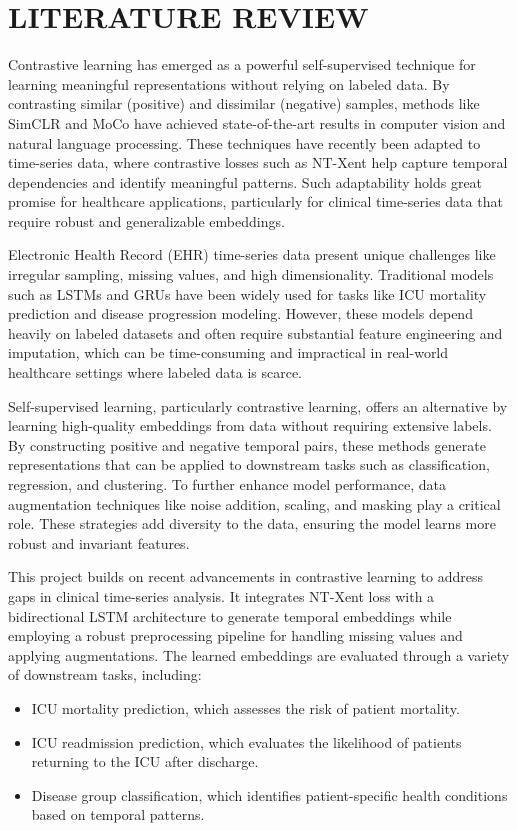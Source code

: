 \documentclass[twocolumn]{article}
\begin{document}
    \section{ \large LITERATURE REVIEW}

    Contrastive learning has emerged as a powerful self-supervised technique for
    learning meaningful representations without relying on labeled data. By contrasting
    similar (positive) and dissimilar (negative) samples, methods like SimCLR
    and MoCo have achieved state-of-the-art results in computer vision and
    natural language processing. These techniques have recently been adapted to time-series
    data, where contrastive losses such as NT-Xent help capture temporal
    dependencies and identify meaningful patterns. Such adaptability holds great
    promise for healthcare applications, particularly for clinical time-series
    data that require robust and generalizable embeddings.

    Electronic Health Record (EHR) time-series data present unique challenges
    like irregular sampling, missing values, and high dimensionality. Traditional
    models such as LSTMs and GRUs have been widely used for tasks like ICU mortality
    prediction and disease progression modeling. However, these models depend heavily
    on labeled datasets and often require substantial feature engineering and imputation,
    which can be time-consuming and impractical in real-world healthcare
    settings where labeled data is scarce.

    Self-supervised learning, particularly contrastive learning, offers an
    alternative by learning high-quality embeddings from data without requiring
    extensive labels. By constructing positive and negative temporal pairs,
    these methods generate representations that can be applied to downstream
    tasks such as classification, regression, and clustering. To further enhance
    model performance, data augmentation techniques like noise addition, scaling,
    and masking play a critical role. These strategies add diversity to the data,
    ensuring the model learns more robust and invariant features.

    This project builds on recent advancements in contrastive learning to
    address gaps in clinical time-series analysis. It integrates NT-Xent loss with
    a bidirectional LSTM architecture to generate temporal embeddings while employing
    a robust preprocessing pipeline for handling missing values and applying augmentations.
    The learned embeddings are evaluated through a variety of downstream tasks, including:
    \begin{itemize}
        \item ICU mortality prediction, which assesses the risk of patient
            mortality.

        \item ICU readmission prediction, which evaluates the likelihood of
            patients returning to the ICU after discharge.

        \item Disease group classification, which identifies patient-specific
            health conditions based on temporal patterns.
    \end{itemize}
\end{document}
